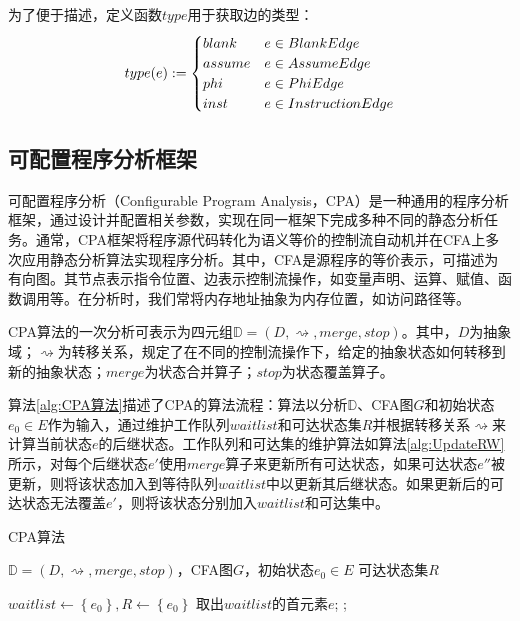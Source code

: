为了便于描述，定义函数$ type $用于获取边的类型：
\begin{align}{\label{align:edgeType}}
	type(e) := \begin{cases}
		blank & e \in BlankEdge\\
		assume & e \in AssumeEdge\\
		phi & e \in PhiEdge\\
		inst & e \in InstructionEdge
	\end{cases}
\end{align}

\subsection{可配置程序分析框架} 
\label{sec:可配置程序分析框架}

可配置程序分析（Configurable Program Analysis，CPA）是一种通用的程序分析框架，通过设计并配置相关参数，实现在同一框架下完成多种不同的静态分析任务。通常，CPA框架将程序源代码转化为语义等价的控制流自动机并在CFA上多次应用静态分析算法实现程序分析。其中，CFA是源程序的等价表示，可描述为有向图。其节点表示指令位置、边表示控制流操作，如变量声明、运算、赋值、函数调用等。在分析时，我们常将内存地址抽象为内存位置，如访问路径\cite{cheng2000modular}等。

CPA算法的一次分析可表示为四元组$ \mathbb{D} = (D, \rightsquigarrow, merge, stop) $。其中，$ D $为抽象域；$ \rightsquigarrow $为转移关系，规定了在不同的控制流操作下，给定的抽象状态如何转移到新的抽象状态；$ merge $为状态合并算子；$ stop $为状态覆盖算子。

算法\ref{alg:CPA算法}描述了CPA的算法流程：算法以分析$ \mathbb{D}$、CFA图$ G $和初始状态$ e_0 \in E $作为输入，通过维护工作队列$ waitlist $和可达状态集$ R $并根据转移关系$ \rightsquigarrow $来计算当前状态$ e $的后继状态。工作队列和可达集的维护算法如算法\ref{alg:UpdateRW}所示，对每个后继状态$ e' $使用$ merge $算子来更新所有可达状态，如果可达状态$ e'' $被更新，则将该状态加入到等待队列$ waitlist $中以更新其后继状态。如果更新后的可达状态无法覆盖$ e' $，则将该状态分别加入$ waitlist $和可达集中。

\begin{breakablealgorithm}
	\caption{CPA算法}
	\label{alg:CPA算法}
	\begin{algorithmic}[1]
		
		\Require $ \mathbb{D} = (D, \rightsquigarrow, merge, stop) $，CFA图$ G $，初始状态$ e_0 \in E $
		\Ensure 可达状态集$ R $
		
		\State $ waitlist \gets \left\{ e_0 \right\} , R \gets \left\{ e_0 \right\}$
			\State 取出$ waitlist $的首元素$ e $;
				\State {};
			\EndFor
		\EndWhile
		
	\end{algorithmic}
\end{breakablealgorithm}

